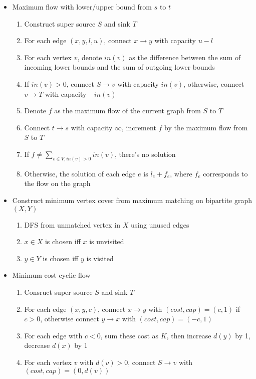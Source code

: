 \normalsize
\begin{itemize}
    \item Maximum flow with lower/upper bound from $s$ to $t$
    \begin{enumerate}
        \item Construct super source $S$ and sink $T$
        \item For each edge $(x, y, l, u)$, connect $x \rightarrow y$ with capacity $u - l$
        \item For each vertex $v$, denote $in(v)$ as the difference between the sum of incoming lower bounds and the sum of outgoing lower bounds
        \item If $in(v) > 0$, connect $S \rightarrow v$ with capacity $in(v)$, otherwise, connect $v \rightarrow T$ with capacity $-in(v)$
        \item Denote $f$ as the maximum flow of the current graph from $S$ to $T$
        \item Connect $t \rightarrow s$ with capacity $\infty$, increment $f$ by the maximum flow from $S$ to $T$
        \item If $f \neq \sum_{v \in V, in(v) > 0}{in(v)}$, there's no solution
        \item Otherwise, the solution of each edge $e$ is $l_e + f_e$, where $f_e$ corresponds to the flow on the graph
    \end{enumerate}
    \item Construct minimum vertex cover from maximum matching on bipartite graph $(X, Y)$
    \begin{enumerate}
        \item DFS from unmatched vertex in $X$ using unused edges
        \item $x \in X$ is chosen iff $x$ is unvisited
        \item $y \in Y$ is chosen iff $y$ is visited
    \end{enumerate}
    \item Minimum cost cyclic flow
    \begin{enumerate}
        \item Consruct super source $S$ and sink $T$
        \item For each edge $(x, y, c)$, connect $x \rightarrow y$ with $(cost, cap) = (c, 1)$ if $c > 0$, otherwise connect $y \rightarrow x$ with $(cost, cap) = (-c, 1)$
        \item For each edge with $c < 0$, sum these cost as $K$, then increase $d(y)$ by 1, decrease $d(x)$ by 1
        \item For each vertex $v$ with $d(v) > 0$, connect $S \rightarrow v$ with $(cost, cap) = (0, d(v))$

\end{enumerate}
\end{itemize}
